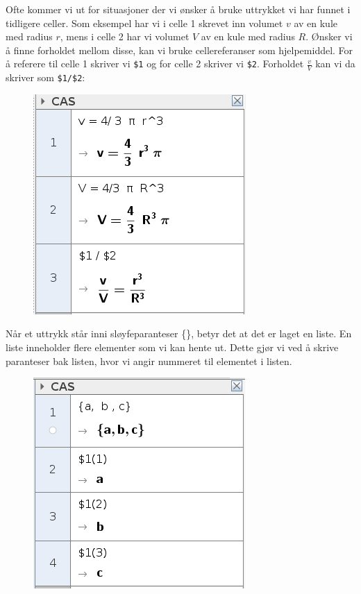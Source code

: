 Ofte kommer vi ut for situasjoner der vi ønsker å bruke uttrykket vi har funnet i tidligere celler. Som eksempel har vi i celle 1 skrevet inn volumet $ v $ av en kule med radius $ r $, mens i celle 2 har vi volumet $ V $ av en kule med radius $ R $. Ønsker vi å finne forholdet mellom disse, kan vi bruke cellereferanser som hjelpemiddel. For å referere til celle 1 skriver vi \texttt{\$1} og for celle 2 skriver vi \texttt{\$2}. Forholdet $ \frac{v}{V} $ kan vi da skriver som \texttt{\$1/\$2}:
\begin{figure}
	\centering
	\includegraphics[scale=0.5]{fig/ref}
\end{figure}

Når et uttrykk står inni sløyfeparanteser \{\}, betyr det at det er laget en liste. En liste inneholder flere elementer som vi kan hente ut. Dette gjør vi ved å skrive paranteser bak listen, hvor vi angir nummeret til elementet i listen.
\begin{figure}
	\centering
	\includegraphics[scale=0.5]{fig/liste}
\end{figure}

